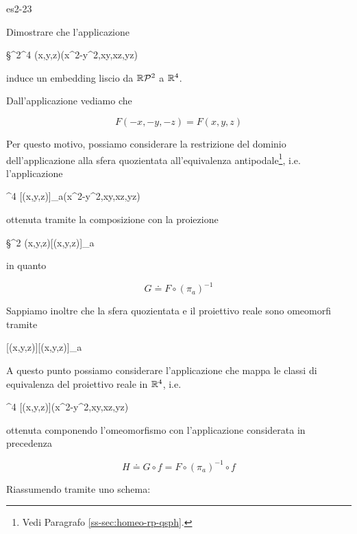 
{es2-23}
{
Dimostrare che l'applicazione

	{\S^{2}}{\R^{4}}
	{(x,y,z)}{(x^{2}-y^{2},xy,xz,yz)}

induce un embedding liscio da $ \mathbb{R}\mathcal{P}^{2} $ a $ \mathbb{R}^{4} $.
}
{
Dall'applicazione vediamo che

\begin{equation}
	F(-x,-y,-z) = F(x,y,z)
\end{equation}

Per questo motivo, possiamo considerare la restrizione del dominio dell'applicazione alla sfera quozientata all'equivalenza antipodale\footnote{%
	Vedi Paragrafo \ref{ss-sec:homeo-rp-qsph}.%
}, i.e. l'applicazione

	{}{\R^{4}}
	{[(x,y,z)]_{a}}{(x^{2}-y^{2},xy,xz,yz)}

ottenuta tramite la composizione con la proiezione

	{\S^{2}}{}
	{(x,y,z)}{[(x,y,z)]_{a}}

in quanto

\begin{equation}
	G \doteq F \circ (\pi_{a})^{-1}
\end{equation}

Sappiamo inoltre che la sfera quozientata e il proiettivo reale sono omeomorfi tramite

	{}{}
	{[(x,y,z)]}{[(x,y,z)]_{a}}

A questo punto possiamo considerare l'applicazione che mappa le classi di equivalenza del proiettivo reale in $ \mathbb{R}^{4} $, i.e.

	{}{\R^{4}}
	{[(x,y,z)]}{(x^{2}-y^{2},xy,xz,yz)}

ottenuta componendo l'omeomorfismo con l'applicazione considerata in precedenza

\begin{equation}
	H \doteq G \circ f = F \circ (\pi_{a})^{-1} \circ f
\end{equation}

Riassumendo tramite uno schema:


}
